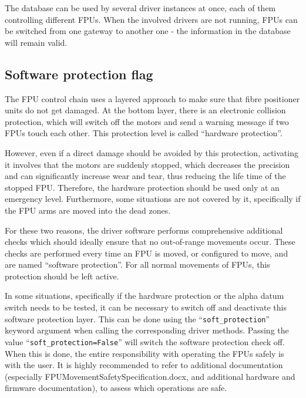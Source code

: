 \documentclass[11pt,a4paper]{scrartcl}
\begin{document}
The database can be used by several driver instances at once, each of
them controlling different FPUs. When the involved drivers are not
running, FPUs can be switched from one gateway to another one - the
information in the database will remain valid.

\subsection{Software protection flag}
\label{sec:protectionintro}
The FPU control chain uses a layered approach to make sure that fibre
positioner units do not get damaged.  At the bottom layer, there is an
electronic collision protection, which will switch off the motors and
send a warning message if two FPUs touch each other. This protection
level is called ``hardware protection''.

 

However, even if a direct damage should be avoided by this protection,
activating it involves that the motors are suddenly stopped, which
decreases the precision and can significantly increase wear and tear,
thus reducing the life time of the stopped FPU. Therefore, the
hardware protection should be used only at an emergency
level. Furthermore, some situations are not covered by it,
specifically if the FPU arms are moved into the dead zones.

For these two reasons, the driver software performs comprehensive
additional checks which should ideally ensure that no out-of-range
movements occur. These checks are performed every time an FPU is
moved, or configured to move, and are named ``software protection''.
For all normal movements of FPUs, this protection should be left
active.

In some situations, specifically if the hardware protection or the
alpha datum switch needs to be tested, it can be necessary to switch
off and deactivate this software protection layer. This can be done
using the ``\texttt{soft\_protection}'' keyword argument when calling
the corresponding driver methods. Passing the value
``\texttt{soft\_protection=False}'' will switch the software
protection check off. When this is done, the entire responsibility
with operating the FPUs safely is with the user. It is highly
recommended to refer to additional documentation (especially
FPUMovementSafetySpecification.docx, and additional hardware and
firmware documentation), to assess which operations are safe.
\end{document}

